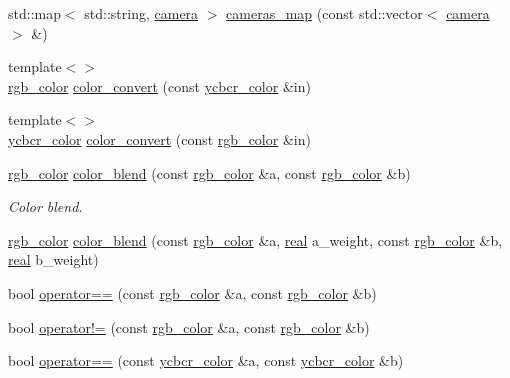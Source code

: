 \begin{DoxyCompactItemize}
\item 
std\+::map$<$ std\+::string, \hyperlink{structtlz_1_1camera}{camera} $>$ \hyperlink{namespacetlz_aee5cd009d147cc17dfb4e8433a78b521}{cameras\+\_\+map} (const std\+::vector$<$ \hyperlink{structtlz_1_1camera}{camera} $>$ \&)
\item 
{\footnotesize template$<$$>$ }\\\hyperlink{structtlz_1_1rgb__color}{rgb\+\_\+color} \hyperlink{namespacetlz_ac5c70844f4828872cad9e450a78c0a98}{color\+\_\+convert} (const \hyperlink{structtlz_1_1ycbcr__color}{ycbcr\+\_\+color} \&in)
\item 
{\footnotesize template$<$$>$ }\\\hyperlink{structtlz_1_1ycbcr__color}{ycbcr\+\_\+color} \hyperlink{namespacetlz_aaf705a9e6c223c6e59eb6cc76aa3c30b}{color\+\_\+convert} (const \hyperlink{structtlz_1_1rgb__color}{rgb\+\_\+color} \&in)
\item 
\hyperlink{structtlz_1_1rgb__color}{rgb\+\_\+color} \hyperlink{namespacetlz_a06be464f6d4245b8c1b6c641b56a229b}{color\+\_\+blend} (const \hyperlink{structtlz_1_1rgb__color}{rgb\+\_\+color} \&a, const \hyperlink{structtlz_1_1rgb__color}{rgb\+\_\+color} \&b)
\begin{DoxyCompactList}\small\item\em Color blend. \end{DoxyCompactList}\item 
\hyperlink{structtlz_1_1rgb__color}{rgb\+\_\+color} \hyperlink{namespacetlz_a87e0efc10449cdee59c0278e87a46c69}{color\+\_\+blend} (const \hyperlink{structtlz_1_1rgb__color}{rgb\+\_\+color} \&a, \hyperlink{namespacetlz_a15fd37cce97f2b8b606af18c2615f602}{real} a\+\_\+weight, const \hyperlink{structtlz_1_1rgb__color}{rgb\+\_\+color} \&b, \hyperlink{namespacetlz_a15fd37cce97f2b8b606af18c2615f602}{real} b\+\_\+weight)
\item 
bool \hyperlink{namespacetlz_a3b289c9c41fe1cdab678e271b767f2f6}{operator==} (const \hyperlink{structtlz_1_1rgb__color}{rgb\+\_\+color} \&a, const \hyperlink{structtlz_1_1rgb__color}{rgb\+\_\+color} \&b)
\item 
bool \hyperlink{namespacetlz_a1f84bedb137fe608d5905ceaf50a07aa}{operator!=} (const \hyperlink{structtlz_1_1rgb__color}{rgb\+\_\+color} \&a, const \hyperlink{structtlz_1_1rgb__color}{rgb\+\_\+color} \&b)
\item 
bool \hyperlink{namespacetlz_a9c35341a5a9f3f96d3dc6f55314c4ae9}{operator==} (const \hyperlink{structtlz_1_1ycbcr__color}{ycbcr\+\_\+color} \&a, const \hyperlink{structtlz_1_1ycbcr__color}{ycbcr\+\_\+color} \&b)

\end{DoxyCompactItemize}
